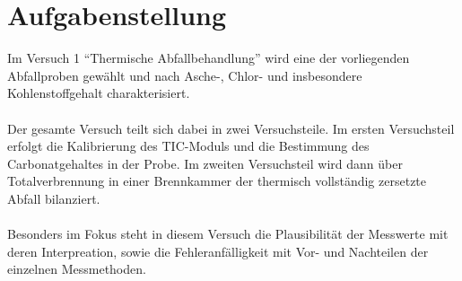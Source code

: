 \chapter{Aufgabenstellung}
\label{sec:aufgabenstellung}
Im Versuch 1 "`Thermische Abfallbehandlung"' wird eine der vorliegenden Abfallproben gewählt und nach Asche-, Chlor- und insbesondere Kohlenstoffgehalt charakterisiert. \\ \\
Der gesamte Versuch teilt sich dabei in zwei Versuchsteile. Im ersten Versuchsteil erfolgt die Kalibrierung des TIC-Moduls und die Bestimmung des Carbonatgehaltes in der Probe. Im zweiten Versuchsteil wird dann über Totalverbrennung in einer Brennkammer der thermisch vollständig zersetzte Abfall bilanziert.\\ \\
Besonders im Fokus steht in diesem Versuch die Plausibilität der Messwerte mit deren Interpreation, sowie die Fehleranfälligkeit mit Vor- und Nachteilen der einzelnen Messmethoden.

